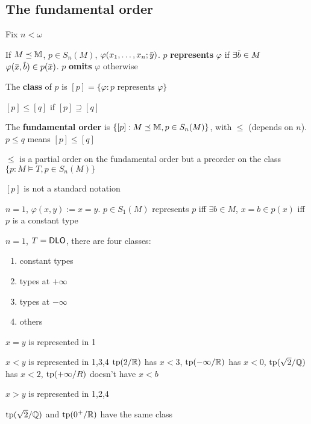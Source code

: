 \documentclass[11pt]{article}
\begin{document}
\subsection{The fundamental order}
\label{sec:org42fe0dc}
Fix \(n<\omega\)
\begin{definition}[]
If \(M\preceq\mathbb{M}\), \(p\in S_n(M)\), \(\varphi(x_1,\dots,x_n;\bary)\). \(p\) \textbf{represents} \(\varphi\)
if \(\exists\barb\in M\) \(\varphi(\barx,\barb)\in p(\barx)\). \(p\) \textbf{omits} \(\varphi\) otherwise

The \textbf{class} of \(p\) is \([p]=\{\varphi:p\text{ represents }\varphi\}\)

\([p]\le[q]\) if \([p]\supseteq[q]\)

The \textbf{fundamental order} is \(\{[p]:M\preceq\mathbb{M},p\in S_n(M)\}\), with \(\le\) (depends on \(n\)). \(p\le q\) means \([p]\le[q]\)
\end{definition}

\begin{remark}
\(\le\) is a partial order on the fundamental order but a preorder on the class \(\{p:M\vDash T,p\in S_n(M)\}\)
\end{remark}

\([p]\) is not a standard notation

\begin{examplle}[]
\(n=1\), \(\varphi(x,y):=x=y\). \(p\in S_1(M)\) represents \(p\) iff \(\exists b\in M\), \(x=b\in p(x)\) iff \(p\)
is a constant type
\end{examplle}

\begin{examplle}[]
\(n=1\), \(T=\operatorname{\textsf{DLO}}\), there are four classes:
\begin{enumerate}
\item constant types
\item types at \(+\infty\)
\item types at \(-\infty\)
\item others
\end{enumerate}


\begin{center}\end{center}

\(x=y\) is represented in 1

\(x<y\) is represented in 1,3,4 \(\operatorname{tp}(2/\mathbb{R})\) has \(x<3\), \(\operatorname{tp}(-\infty/\mathbb{R})\)
has \(x<0\), \(\operatorname{tp}(\sqrt{2}/\mathbb{Q})\) has \(x<2\), \(\operatorname{tp}(+\infty/R)\) doesn't have \(x<b\)

\(x>y\) is represented in 1,2,4

\(\operatorname{tp}(\sqrt{2}/\mathbb{Q})\) and \(\operatorname{tp}(0^+/\mathbb{R})\) have the same class
\end{examplle}
\end{document}
